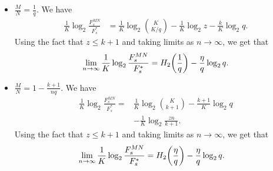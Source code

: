 \documentclass[journal,twocolumn]{IEEEtran}
\theoremstyle{definition}
\newcommand{\aditya}[1]{\marginpar{+}{\bf Aditya's remark}: {\em #1}}
\newcommand{\litang}[1]{\marginpar{+}{\bf Li's remark}: {\em #1}}
\begin{document}
\begin{itemize}
	\item $\frac{M}{N}=\frac{1}{q}$.
We have
\begin{align*}
\frac{1}{K} \log_2 \frac{F_s^{MN}}{F_s^*} &= \frac{1}{K} \log_2 \binom{K}{K/q} - \frac{1}{K} \log_2 z - \frac{k}{K} \log_2 q.
\end{align*}
Using the fact that $z \leq k+1$ and taking limits as $n \rightarrow \infty$, we get that
\begin{align*}
\lim_{n \rightarrow \infty} \frac{1}{K} \log_2 \frac{F_s^{MN}}{F_s^*} = H_2\bigg{(}\frac{1}{q}\bigg{)} - \frac{\eta}{q} \log_2 q.
\end{align*}

\item $\frac{M}{N}=1-\frac{k+1}{nq}$. We have %
\begin{align*}
\frac{1}{K} \log_2 \frac{F_s^{MN}}{F_s^*} =& \frac{1}{K}\log_2 \binom{K}{k+1}-\frac{k+1}{K}\log_2 q\\
&-\frac{1}{K}\log_2\frac{zn}{k+1}.
    \end{align*}
 Using the fact that $z \leq k+1$ and taking limits as $n \rightarrow \infty$, we get that
   	\begin{align*}
  \lim_{n \rightarrow \infty}  	\frac{1}{K} \log_2 \frac{F_s^{MN}}{F_s^*}&=H_2\bigg{(}\frac{\eta}{q}\bigg{)} - \frac{\eta}{q} \log_2 q.
   	\end{align*}
\end{itemize}
\end{document}
